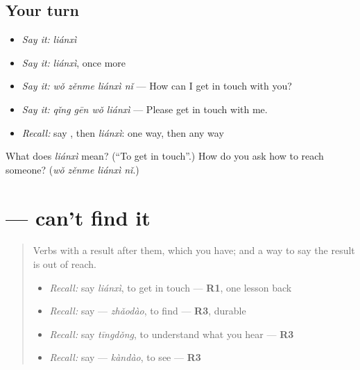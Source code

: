 \subsection*{Your turn}
\begin{itemize}
\raggedright
  \item \emph{Say it:} \emph{liánxì}
  \item \emph{Say it:} \emph{liánxì}, once more
  \item \emph{Say it:} \emph{wǒ zěnme liánxì nǐ} — How can I get in touch with you?
  \item \emph{Say it:} \emph{qǐng gēn wǒ liánxì} — Please get in touch with me.
  \item \emph{Recall:} say , then \emph{liánxì}: one way, then any way
\end{itemize}

\begin{tcolorbox}[breakable,colback=teal!4,colframe=teal!35!black,title={Before you move on}]
What does \emph{liánxì} mean? (\textquotedblleft{}To get in touch\textquotedblright{}.) How do you ask how to reach someone? (\emph{wǒ zěnme liánxì nǐ}.)
\end{tcolorbox}
\section[\texorpdfstring{\zh{找不到} (zhǎo bu dào)}{找不到 (zhǎo bu dào)}]{ — can't find it}

\label{lesson:ZH-C285-potential}



\begin{quote}
Verbs with a result after them, which you have; and a way to say the result is out of reach.

\begin{itemize}
\raggedright
  \item \emph{Recall:} say \emph{liánxì}, to get in touch — \textbf{R1}, one lesson back
  \item \emph{Recall:} say  — \emph{zhǎodào}, to find — \textbf{R3}, durable
  \item \emph{Recall:} say \emph{tīngdǒng}, to understand what you hear — \textbf{R3}
  \item \emph{Recall:} say  — \emph{kàndào}, to see — \textbf{R3}
\end{itemize}
\end{quote}

